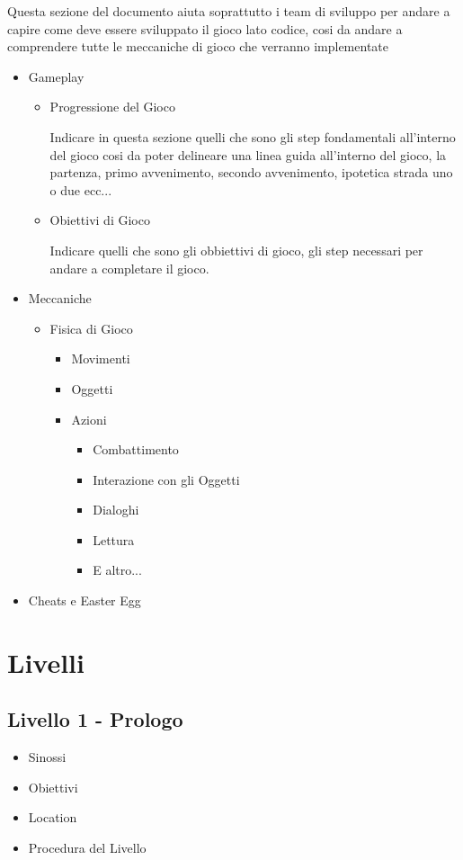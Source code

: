 \documentclass{report}
\begin{document}
Questa sezione del documento aiuta soprattutto i team di sviluppo per andare a capire come deve essere sviluppato il gioco lato codice, cosi da andare a comprendere tutte le meccaniche di gioco che verranno implementate
\begin{itemize}
    \item Gameplay
    \begin{itemize}
        \item Progressione del Gioco

        Indicare in questa sezione quelli che sono gli step fondamentali all'interno del gioco cosi da poter delineare una linea guida all'interno del gioco, la partenza, primo avvenimento, secondo avvenimento, ipotetica strada uno o due ecc...
        \item Obiettivi di Gioco

        Indicare quelli che sono gli obbiettivi di gioco, gli step necessari per andare a completare il gioco.
    \end{itemize}
    \item Meccaniche
    \begin{itemize}
        \item Fisica di Gioco
        \begin{itemize}
            \item Movimenti
            \item Oggetti
            \item Azioni
            \begin{itemize}
                \item Combattimento
                \item Interazione con gli Oggetti
                \item Dialoghi
                \item Lettura
                \item E altro...
            \end{itemize}
        \end{itemize}
    \end{itemize}
    \item Cheats e Easter Egg
\end{itemize}

\newpage

\section{Livelli}
\subsection{Livello 1 - Prologo}
\begin{itemize}
    \item Sinossi
    \item Obiettivi
    \item Location
    \item Procedura del Livello
\end{itemize}
\end{document}
